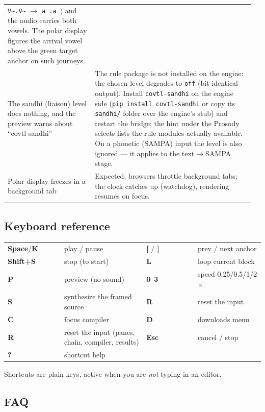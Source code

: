 \documentclass[11pt,a4paper]{article}
\newcommand{\key}[1]{\textbf{#1}}
\begin{document}
\begin{longtable}{p{0.34\linewidth}p{0.62\linewidth}}
\texttt{V\~{}.V\~{}} $\rightarrow$ \texttt{a~.a~}) and the audio carries
both vowels. The polar display figures the arrival vowel above the green
target anchor on such journeys. \\
The sandhi (liaison) level does nothing, and the preview warns about
``covtl-sandhi'' & The rule package is not installed on the engine: the
chosen level degrades to \texttt{off} (bit-identical output). Install
\texttt{covtl-sandhi} on the engine side (\texttt{pip install
covtl-sandhi} or copy its \texttt{sandhi/} folder over the engine's
stub) and restart the bridge; the hint under the Prosody selects lists
the rule modules actually available. On a phonetic (SAMPA) input the
level is also ignored --- it applies to the text$\rightarrow$SAMPA
stage. \\
Polar display freezes in a background tab & Expected: browsers throttle
background tabs; the clock catches up (watchdog), rendering resumes on
focus. \\
\end{longtable}

\subsection{Keyboard reference}

\begin{longtable}{p{0.22\linewidth}p{0.32\linewidth}p{0.2\linewidth}p{0.3\linewidth}}
\key{Space}/\key{K} & play / pause & \key{[} / \key{]} & prev / next anchor \\
\key{Shift+S} & stop (to start) & \key{L} & loop current block \\
\key{P} & preview (no sound) & \key{0}--\key{3} & speed 0.25/0.5/1/2$\times$ \\
\key{S} & synthesize the framed source & \key{R} & reset the input \\
\key{C} & focus compiler & \key{D} & downloads menu \\
\key{R} & reset the input (panes, chain, compiler, results) & \key{Esc} & cancel / stop \\
\key{?} & shortcut help & & \\
\end{longtable}

Shortcuts are plain keys, active when you are \emph{not} typing in an
editor.

\subsection{FAQ}
\end{document}

